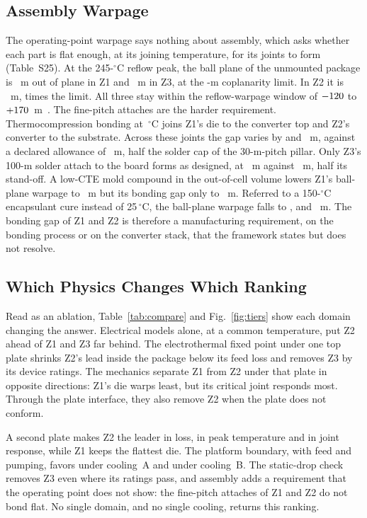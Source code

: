 \subsection{Assembly Warpage}\label{sec:compare-assembly}
The operating-point warpage says nothing about assembly, which asks whether each part is flat
enough, at its joining temperature, for its joints to form (Table~S25). At the 245-$^\circ$C reflow
peak, the ball plane of the unmounted package is \MvRfBgaZone~\textmu m out of plane in Z1 and
\MvRfBgaZthree~\textmu m in Z3, at the \MvCoplLim-\textmu m coplanarity limit. In Z2 it is
\MvRfBgaZtwo~\textmu m, \MvRfCoplZtwo{} times the limit. All three stay within the
reflow-warpage window of $-120$ to $+170$~\textmu m~\cite{JEDEC_JEP95}. The fine-pitch
attaches are the harder requirement. Thermocompression bonding at \MvRfTcbTZone\,$^\circ$C joins
Z1's die to the converter top and Z2's converter to the substrate. Across these joints the gap
varies by \MvRfTcbZone{} and \MvRfTcbZtwo~\textmu m, against a declared allowance of
\MvTcbLim~\textmu m, half the solder cap of the 30-\textmu m-pitch pillar. Only Z3's 100-\textmu m
solder attach to the board forms as designed, at \MvRfTcbZthree~\textmu m against
\MvAttLimZthree~\textmu m, half its stand-off. A low-CTE mold compound in the out-of-cell volume
lowers Z1's ball-plane warpage to \MvRfBgaEmcZone~\textmu m but its bonding gap only to
\MvRfTcbEmcZone~\textmu m. Referred
to a 150-$^\circ$C encapsulant cure instead of 25\,$^\circ$C, the ball-plane warpage falls to
\MvRfCureZone, \MvRfCureZtwo{} and \MvRfCureZthree~\textmu m. The bonding gap of Z1 and Z2 is
therefore a manufacturing requirement, on the bonding process or on the converter stack, that the
framework states but does not resolve.

\subsection{Which Physics Changes Which Ranking}\label{sec:compare-ablation}
Read as an ablation, Table~\ref{tab:compare} and Fig.~\ref{fig:tiers} show each domain changing the
answer. Electrical models alone, at a common temperature, put Z2 ahead of Z1 and Z3 far behind.
The electrothermal fixed point under one top plate shrinks Z2's lead inside the package below its
feed loss and removes Z3 by its device ratings. The mechanics separate Z1 from Z2 under that plate
in opposite directions: Z1's die warps least, but its critical joint responds most. Through the
plate interface, they also remove Z2 when the plate does not conform.

A second plate makes Z2 the leader in loss, in peak temperature and in joint response, while Z1
keeps the flattest die. The platform boundary, with feed and pumping, favors \WrLowPlatA{} under
cooling~A and \WrLowPlatB{} under cooling~B. The static-drop check removes Z3 even where its
ratings pass, and assembly adds a requirement that the operating point does not show: the
fine-pitch attaches of Z1 and Z2 do not bond flat. No single domain, and no single cooling,
returns this ranking.

